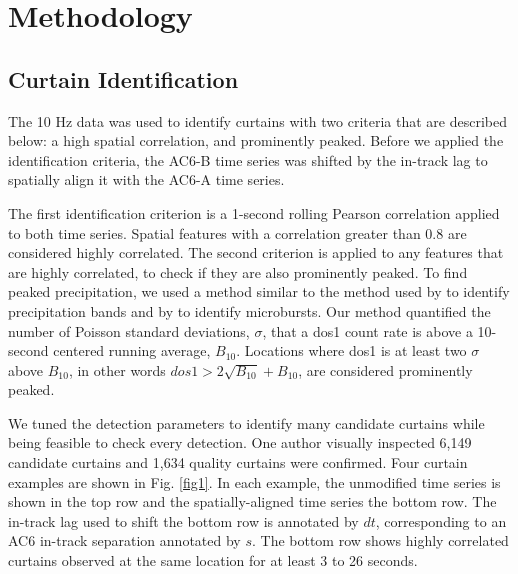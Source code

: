 \documentclass[draft]{agujournal2019}
\begin{document}
\section{Methodology} 
\subsection{Curtain Identification} \label{curtain_identification}
The 10 Hz data was used to identify curtains with two criteria that are described below: a high spatial correlation, and prominently peaked. Before we applied the identification criteria, the AC6-B time series was shifted by the in-track lag to spatially align it with the AC6-A time series. 

The first identification criterion is a 1-second rolling Pearson correlation applied to both time series. Spatial features with a correlation greater than 0.8 are considered highly correlated. The second criterion is applied to any features that are highly correlated, to check if they are also prominently peaked. To find peaked precipitation, we used a method similar to the method used by  to identify precipitation bands and by  to identify microbursts. Our method quantified the number of Poisson standard deviations, $\sigma$, that a dos1 count rate is above a 10-second centered running average, $B_{10}$. Locations where dos1 is at least two $\sigma$ above $B_{10}$, in other words $dos1 > 2\sqrt{B_{10}} + B_{10}$, are considered prominently peaked. 

We tuned the detection parameters to identify many candidate curtains while being feasible to check every detection. One author visually inspected 6,149 candidate curtains and 1,634 quality curtains were confirmed. Four curtain examples are shown in Fig. \ref{fig1}. In each example, the unmodified time series is shown in the top row and the spatially-aligned time series the bottom row. The in-track lag used to shift the bottom row is annotated by $dt$, corresponding to an AC6 in-track separation annotated by $s$. The bottom row shows highly correlated curtains observed at the same location for at least 3 to 26 seconds.
\end{document}
